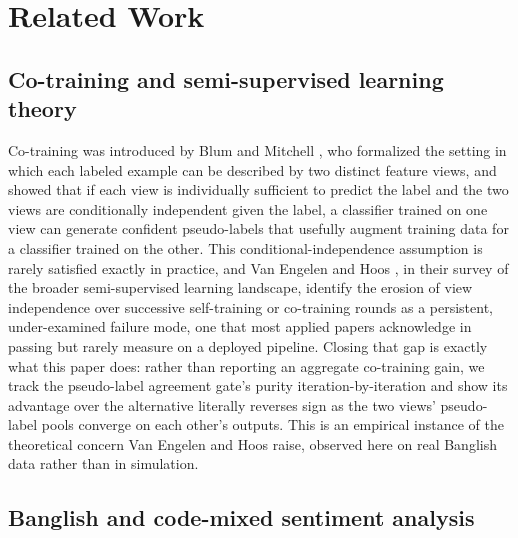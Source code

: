 \documentclass[conference]{IEEEtran}
\begin{document}
\section{Related Work}
\label{sec:related}

\subsection{Co-training and semi-supervised learning theory}

Co-training was introduced by Blum and Mitchell \citep{blum1998combining}, who
formalized the setting in which each labeled example can be described by two
distinct feature views, and showed that if each view is individually
sufficient to predict the label and the two views are conditionally
independent given the label, a classifier trained on one view can generate
confident pseudo-labels that usefully augment training data for a classifier
trained on the other. This conditional-independence assumption is rarely
satisfied exactly in practice, and Van Engelen and Hoos
\citep{vanengelen2020survey}, in their survey of the broader semi-supervised
learning landscape, identify the erosion of view independence over successive
self-training or co-training rounds as a persistent, under-examined failure
mode, one that most applied papers acknowledge in passing but rarely measure
on a deployed pipeline. Closing that gap is exactly what this paper does:
rather than reporting an aggregate co-training gain, we track the pseudo-label
agreement gate's purity iteration-by-iteration and show its advantage over the
alternative literally reverses sign as the two views' pseudo-label pools
converge on each other's outputs. This is an empirical instance of the
theoretical concern Van Engelen and Hoos raise, observed here on real Banglish
data rather than in simulation.

\subsection{Banglish and code-mixed sentiment analysis}
\end{document}

